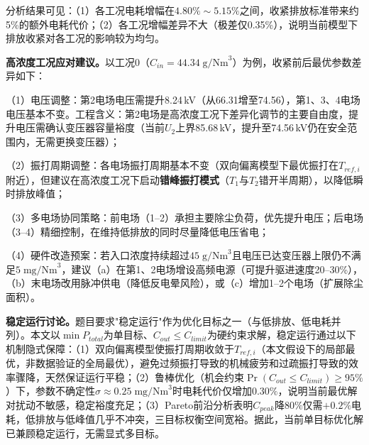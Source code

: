 分析结果可见：（1）各工况电耗增幅在$4.80\%\sim 5.15\%$之间，收紧排放标准带来约5\%的额外电耗代价；（2）各工况增幅差异不大（极差仅0.35\%），说明当前模型下排放收紧对各工况的影响较为均匀。

\textbf{高浓度工况应对建议。}以工况0（$C_{in}=44.34\;\text{g/Nm}^3$）为例，收紧前后最优参数差异如下：

（1）电压调整：第2电场电压需提升8.24\,kV（从66.31增至74.56），第1、3、4电场电压基本不变。工程含义：第2电场是高浓度工况下差异化调节的主要自由度，提升电压需确认变压器容量裕度（当前$U_2$上界85.68\,kV，提升至74.56\,kV仍在安全范围内，无需更换变压器）；

（2）振打周期调整：各电场振打周期基本不变（双向偏离模型下最优振打在$T_{ref,i}$附近），但建议在高浓度工况下启动\textbf{错峰振打模式}（$T_1$与$T_2$错开半周期），以降低瞬时排放峰值；

（3）多电场协同策略：前电场（1--2）承担主要除尘负荷，优先提升电压；后电场（3--4）精细控制，在维持低排放的同时尽量降低电压省电；

（4）硬件改造预案：若入口浓度持续超过$45\;\text{g/Nm}^3$且电压已达变压器上限仍不满足$5\;\text{mg/Nm}^3$，建议（a）在第1、2电场增设高频电源（可提升驱进速度20--30\%），（b）末电场改用脉冲供电（降低反电晕风险），或（c）增加1--2个电场（扩展除尘面积）。

\textbf{稳定运行讨论。}题目要求"稳定运行"作为优化目标之一（与低排放、低电耗并列）。本文以$\min P_{total}$为单目标、$C_{out}\leq C_{limit}$为硬约束求解，稳定运行通过以下机制隐式保障：（1）双向偏离模型使振打周期收敛于$T_{ref,i}$（本文假设下的局部最优，非数据验证的全局最优），避免过频振打导致的机械疲劳和过疏振打导致的效率骤降，天然保证运行平稳；（2）鲁棒优化（机会约束$\Pr(C_{out}\leq C_{limit})\geq 95\%$）下，参数不确定性$\sigma\approx 0.25\;\text{mg/Nm}^3$时电耗代价仅增加$0.30\%$，说明当前最优解对扰动不敏感，稳定裕度充足；（3）Pareto前沿分析表明$C_{peak}$降$80\%$仅需$+0.2\%$电耗，低排放与低峰值几乎不冲突，三目标权衡空间宽裕。据此，当前单目标优化解已兼顾稳定运行，无需显式多目标。

